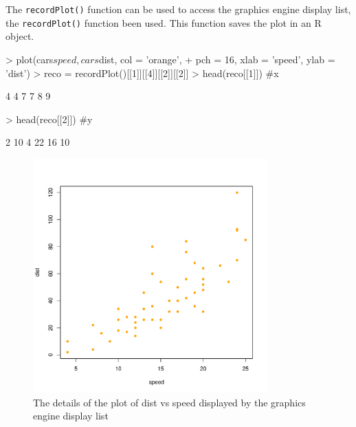 \documentclass[paper=a4, fontsize=11pt]{report}
\begin{document}
The \texttt{recordPlot()} function can be used to access the graphics engine display list, the \texttt{recordPlot()} function been used. This function saves the plot in an R object. 

\begin{Schunk}
\begin{Sinput}
> plot(cars$speed, cars$dist, col = 'orange', 
+       pch = 16, xlab = 'speed', ylab = 'dist')
> reco = recordPlot()[[1]][[4]][[2]][[2]]
> head(reco[[1]]) #x
\end{Sinput}
\begin{Soutput}
[1] 4 4 7 7 8 9
\end{Soutput}
\begin{Sinput}
> head(reco[[2]]) #y
\end{Sinput}
\begin{Soutput}
[1]  2 10  4 22 16 10
\end{Soutput}
\end{Schunk}


\begin{figure}[h]
\begin{center}
  \includegraphics[height = 9cm, width = 9cm]{figure/report_3.pdf}
  \caption{The details of the plot of dist vs speed displayed by the graphics engine display list}
  	\label{figure4}
\end{center}
\end{figure}
\end{document}
